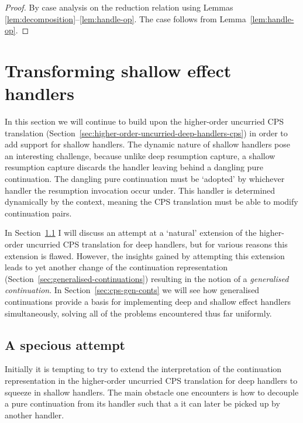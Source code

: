 \documentclass[12pt,phd,lfcs,twoside,openright,logo,leftchapter,normalheadings]{infthesis}
\theoremstyle{plain}
\newtheorem{corollary}[theorem]{Corollary}
\theoremstyle{definition}
\begin{document}
%
\begin{proof}
  By case analysis on the reduction relation using Lemmas
  \ref{lem:decomposition}--\ref{lem:handle-op}. The  case
  follows from Lemma~\ref{lem:handle-op}.
\end{proof}
%
%

\section{Transforming shallow effect handlers}
\label{sec:cps-shallow}

In this section we will continue to build upon the higher-order
uncurried CPS translation
(Section~\ref{sec:higher-order-uncurried-deep-handlers-cps}) in order
to add support for shallow handlers. The dynamic nature of shallow
handlers pose an interesting challenge, because unlike deep resumption
capture, a shallow resumption capture discards the handler leaving
behind a dangling pure continuation. The dangling pure continuation
must be `adopted' by whichever handler the resumption invocation occur
under. This handler is determined dynamically by the context, meaning
the CPS translation must be able to modify continuation pairs.

In Section~\ref{sec:cps-shallow-flawed} I will discuss an attempt at a
`natural' extension of the higher-order uncurried CPS translation for
deep handlers, but for various reasons this extension is
flawed. However, the insights gained by attempting this extension
leads to yet another change of the continuation representation
(Section~\ref{sec:generalised-continuations}) resulting in the notion
of a \emph{generalised continuation}.
%
In Section~\ref{sec:cps-gen-conts} we will see how generalised
continuations provide a basis for implementing deep and shallow effect
handlers simultaneously, solving all of the problems encountered thus
far uniformly.

\subsection{A specious attempt}
\label{sec:cps-shallow-flawed}
%
Initially it is tempting to try to extend the interpretation of the
continuation representation in the higher-order uncurried CPS
translation for deep handlers to squeeze in shallow handlers. The main
obstacle one encounters is how to decouple a pure continuation from
its handler such that a it can later be picked up by another handler.
\end{document}
